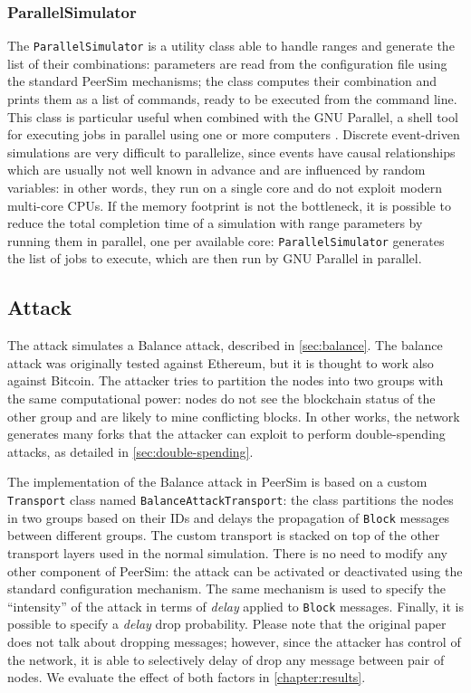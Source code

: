 \subsubsection{ParallelSimulator}
The \texttt{ParallelSimulator} is a utility class able to handle ranges and generate the list of their combinations:
parameters are read from the configuration file using the standard PeerSim mechanisms;
the class computes their combination and prints them as a list of commands, ready to be executed from the command line.
This class is particular useful when combined with the GNU Parallel, a shell tool for executing jobs in parallel using one or more computers \cite{gnu_parallel}.
Discrete event-driven simulations are very difficult to parallelize, since events have causal relationships which are usually not well known in advance and are influenced by random variables:
in other words, they run on a single core and do not exploit modern multi-core CPUs.
If the memory footprint is not the bottleneck, it is possible to reduce the total completion time of a simulation with range parameters by running them in parallel, one per available core:
\texttt{ParallelSimulator} generates the list of jobs to execute, which are then run by GNU Parallel in parallel.

\subsection{Attack}
The attack simulates a Balance attack, described in \cref{sec:balance}.
The balance attack was originally tested against Ethereum, but it is thought to work also against Bitcoin.
The attacker tries to partition the nodes into two groups with the same computational power:
nodes do not see the blockchain status of the other group and are likely to mine conflicting blocks.
In other works, the network generates many forks that the attacker can exploit to perform double-spending attacks, as detailed in \cref{sec:double-spending}.

\bigskip
The implementation of the Balance attack in PeerSim is based on a custom \texttt{Transport} class named \texttt{BalanceAttackTransport}:
the class partitions the nodes in two groups based on their IDs and delays the propagation of \texttt{Block} messages between different groups.
The custom transport is stacked on top of the other transport layers used in the normal simulation.
There is no need to modify any other component of PeerSim:
the attack can be activated or deactivated using the standard configuration mechanism.
The same mechanism is used to specify the ``intensity'' of the attack in terms of \textit{delay} applied to \texttt{Block} messages.
Finally, it is possible to specify a \textit{delay} drop probability.
Please note that the original paper \cite{balance_attack_2017} does not talk about dropping messages;
however, since the attacker has control of the network, it is able to selectively delay of drop any message between pair of nodes.
We evaluate the effect of both factors in \cref{chapter:results}.
